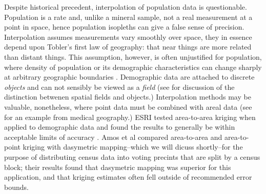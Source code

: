 \documentclass[draft]{article}
\begin{document}
Despite historical precedent, interpolation of population data is questionable.  Population is a rate and, unlike a mineral sample, not a real measurement at a point in space, hence population isopleths can give a false sense of precision.  Interpolation assumes measurements vary smoothly over space, they in essence depend upon Tobler's first law of geography: that near things are more related than distant things.  This assumption, however, is often unjustified for population, where density of population or its demographic characteristics can change sharply at arbitrary geographic boundaries \cite{schelling71}.  Demographic data are attached to discrete {\em objects} and can not sensibly be viewed as a {\em field} (see \cite{cova02, kjenstad06} for discussion of the distinction betwenen spatial fields and objects.)  %
Interpolation methods may be valuable, nonetheless, where point data must be combined with areal data (see \cite{gooaverts10} for an example from medical geography.)  ESRI tested area-to-area kriging when applied to demographic data and found the results to generally be within acceptable limits of accuracy \cite{carson13}.  Amos et al \cite{amos17} compared area-to-area and area-to-point kriging with dasymetric mapping--which we will dicuss shortly--for the purpose of distributing census data into voting precints that are split by a census block; their results found that dasymetric mapping was superior for this application, and that kriging estimates often fell outside of recommended error bounds.
\end{document}
